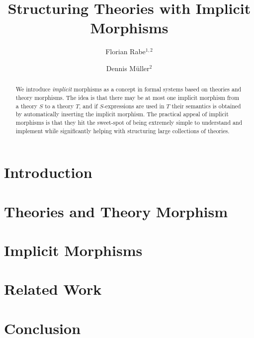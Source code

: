 \documentclass[orivec]{llncs}
\begin{document}
\title{Structuring Theories with Implicit Morphisms}
\author{Florian Rabe$^{1,2}$ \and Dennis M\"uller$^2$}
\maketitle

\begin{abstract}
We introduce \emph{implicit} morphisms as a concept in formal systems based on theories and theory morphisms.
The idea is that there may be at most one implicit morphism from a theory $S$ to a theory $T$, and if $S$-expressions are used in $T$ their semantics is obtained by automatically inserting the implicit morphism.
The practical appeal of implicit morphisms is that they hit the sweet-spot of being extremely simple to understand and implement while significantly helping with structuring large collections of theories.
\end{abstract}


\section{Introduction}


\section{Theories and Theory Morphism}


%

\section{Implicit Morphisms}


%

\section{Related Work}


\section{Conclusion}





\end{document}
